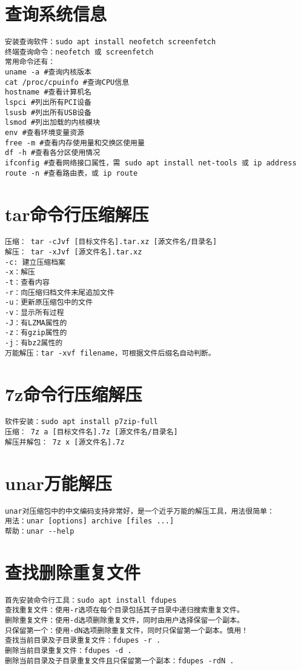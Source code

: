 \documentclass[a4paper,fontset=fandol,zihao=-4,linespread=1.2,oneside]{ctexbook}
\begin{document}
\section{查询系统信息}
\begin{lstlisting}
安装查询软件：sudo apt install neofetch screenfetch
终端查询命令：neofetch 或 screenfetch
常用命令还有：
uname -a #查询内核版本
cat /proc/cpuinfo #查询CPU信息
hostname #查看计算机名
lspci #列出所有PCI设备
lsusb #列出所有USB设备
lsmod #列出加载的内核模块
env #查看环境变量资源
free -m #查看内存使用量和交换区使用量
df -h #查看各分区使用情况
ifconfig #查看网络接口属性，需 sudo apt install net-tools 或 ip address
route -n #查看路由表，或 ip route
\end{lstlisting}

\section{tar命令行压缩解压}
\begin{lstlisting}
压缩： tar -cJvf [目标文件名].tar.xz [源文件名/目录名]
解压： tar -xJvf [源文件名].tar.xz
-c: 建立压缩档案
-x：解压
-t：查看内容
-r：向压缩归档文件末尾追加文件
-u：更新原压缩包中的文件
-v：显示所有过程
-J：有LZMA属性的
-z：有gzip属性的
-j：有bz2属性的
万能解压：tar -xvf filename，可根据文件后缀名自动判断。
\end{lstlisting}

\section{7z命令行压缩解压}
\begin{lstlisting}
软件安装：sudo apt install p7zip-full
压缩： 7z a [目标文件名].7z [源文件名/目录名]
解压并解包： 7z x [源文件名].7z
\end{lstlisting}

\section{unar万能解压}
\begin{lstlisting}
unar对压缩包中的中文编码支持非常好，是一个近乎万能的解压工具，用法很简单：
用法：unar [options] archive [files ...]
帮助：unar --help
\end{lstlisting}

\section{查找删除重复文件}
\begin{lstlisting}
首先安装命令行工具：sudo apt install fdupes
查找重复文件：使用-r选项在每个目录包括其子目录中递归搜索重复文件。
删除重复文件：使用-d选项删除重复文件，同时由用户选择保留一个副本。
只保留第一个：使用-dN选项删除重复文件，同时只保留第一个副本。慎用！
查找当前目录及子目录重复文件：fdupes -r .
删除当前目录重复文件：fdupes -d .
删除当前目录及子目录重复文件且只保留第一个副本：fdupes -rdN .
\end{lstlisting}
\end{document}
